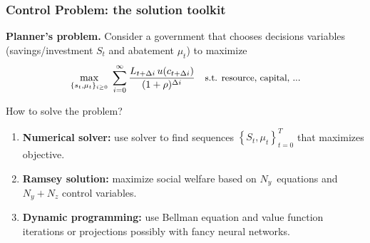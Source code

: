 \documentclass[xcolor=x11names,compress,aspectratio=169]{beamer}%
\begin{document}
\begin{frame}%
%

\frametitle{Control Problem: the solution toolkit}%


\textbf{Planner's problem.} Consider a government that chooses decisions
variables (savings/investment $S_{t}$ and abatement $\mu_{t}$) to maximize
\[
\max_{\{s_{t},\mu_{t}\}_{i\geq0}}\;\sum_{i=0}^{\infty}\frac{L_{t+\Delta
i}\,u(c_{t+\Delta i})}{(1+\rho)^{\Delta i}}\quad\text{{\small s.t. resource,
capital, ..}.}%
\]


How to solve the problem?

\begin{enumerate}
\item \textbf{Numerical solver:} use solver to find sequences $\left\{
S_{t},\mu_{t}\right\}  _{t=0}^{T}$ that maximizes objective.

\item \textbf{Ramsey solution:} maximize social welfare based on $N_{y}%
$\ equations and $N_{y}+N_{z}$ control variables.

\item \textbf{Dynamic programming:} use Bellman equation and value function
iterations or projections possibly with fancy neural networks.
\end{enumerate}

%

\transboxout
\end{frame}%
%
\end{document}
